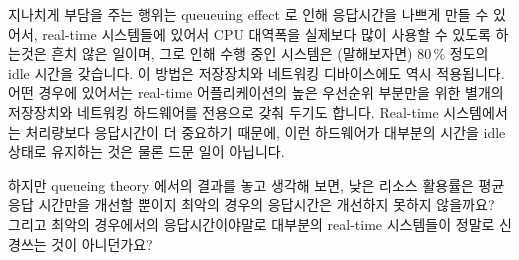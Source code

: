 지나치게 부담을 주는 행위는 queueuing effect 로 인해 응답시간을 나쁘게 만들 수
있어서, real-time 시스템들에 있어서 CPU 대역폭을 실제보다 많이 사용할 수 있도록
하는것은 흔치 않은 일이며, 그로 인해 수행 중인 시스템은 (말해보자면) 80\,\%
정도의 idle 시간을 갖습니다.
이 방법은 저장장치와 네트워킹 디바이스에도 역시 적용됩니다.
어떤 경우에 있어서는 real-time 어플리케이션의 높은 우선순위 부분만을 위한
별개의 저장장치와 네트워킹 하드웨어를 전용으로 갖춰 두기도 합니다.
Real-time 시스템에서는 처리량보다 응답시간이 더 중요하기 때문에, 이런
하드웨어가 대부분의 시간을 idle 상태로 유지하는 것은 물론 드문 일이 아닙니다.

\QuickQuiz{}
	하지만 queueing theory 에서의 결과를 놓고 생각해 보면, 낮은 리소스
	활용률은 평균 응답 시간만을 개선할 뿐이지 최악의 경우의 응답시간은
	개선하지 못하지 않을까요?
	그리고 최악의 경우에서의 응답시간이야말로 대부분의 real-time 시스템들이
	정말로 신경쓰는 것이 아니던가요?
	\iffalse

